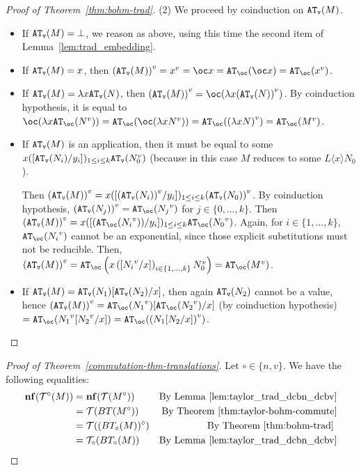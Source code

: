 \documentclass[10pt,a4paper]{article}
\newcommand{\<}{\langle}
\renewcommand{\>}{\rangle}
\newcommand{\nf}[1]{\mathbf{nf}(#1)}
\newcommand{\tradv}[1]{\ensuremath{{#1}^v}}
\newcommand{\taylor}[1]{\ensuremath{\mathcal{T}(#1)}}
\newcommand{\btb}{\ensuremath{{\tt{AT}_\oc}}}
\newcommand{\btv}{\ensuremath{{\tt{AT}_v}}}
\begin{document}
\begin{proof}[Proof of Theorem~\ref{thm:bohm-trad}]
	(2) We proceed by coinduction on $\btv(M)$.
	\begin{itemize}
		\item If $\btv(M)=\bot$, we reason as above, using this time the
			second item of Lemma~\ref{lem:trad_embedding}.
		\item If $\btv(M)=x$, then $\tradv{(\btv(M))}=\tradv x=\oc
			x=\btb(\oc x)=\btb(\tradv x)$.
		\item If $\btv(M)=\lambda x\btv(N)$, then
			$\tradv{(\btv(M))}=\oc(\lambda x\tradv{(\btv(N))})$. By
			coinduction hypothesis, it is equal to $\oc(\lambda
			x\btb(\tradv N))=\btb(\oc(\lambda x\tradv
			N))=\btb(\tradv{(\lambda xN)})=\btb(\tradv M)$.
		\item If $\btv(M)$ is an application, then it must be equal to
			some $x([\btv(N_i)/y_i])_{1\leq i\leq k}\btv(\tradv N_0)$
			(because in this case $M$ reduces to some $L\<x\>N_0$).
			
			Then $\tradv{(\btv(M))}=
			x([\tradv{(\btv(N_i))}/y_i])_{1\leq i\leq k}\tradv{(\btv(N_0))}$.
			By coinduction hypothesis,
			$\tradv{(\btv(N_j))}=\btb(\tradv{N_j})$ for
			$j\in\{0,\dots ,k\}$. Then
			$\tradv{(\btv(M))}=
			x([(\btb(\tradv{N_i}))/y_i])_{1\leq i\leq
			k}\btb(\tradv{N_0})$. Again, for $i\in\{1,\dots ,k\}$,
			$\btb(\tradv{N_i})$ cannot be an exponential, since
			those explicit substitutions must not be reducible. Then,
			$\tradv{(\btv(M))}=\btb\left(x\left([\tradv{N_i}/x]\right)_{i\in\{1,\dots ,k\}}\tradv
			N_0\right)=\btb(\tradv M)$.
		\item If $\btv(M)=\btv(N_1)[\btv(N_2)/x]$, then again $\btv(N_2)$
			cannot be a value, hence
			$\tradv{(\btv(M))}=\btb(\tradv{N_1})[\btb(\tradv{N_2})/x]$
			(by coinduction hypothesis)
			$=\btb(\tradv{N_1}[\tradv{N_2}/x])=\btb(\tradv{(N_1[N_2/x])})$. \qedhere
	\end{itemize}
\end{proof}

\begin{proof}[Proof of Theorem~\ref{commutation-thm-translations}]
	Let $\circ\in\{n,v\}$. We have the following equalities:
	\begin{align*}
		\nf{\mathcal T^\circ (M)} &= \nf{\taylor{M^\circ}} &\text{By
		Lemma~\ref{lem:taylor_trad_dcbn_dcbv}} \\
		&= \taylor{BT(M^\circ)}   &\text{By
		Theorem~\ref{thm:taylor-bohm-commute}}  \\
		&= \taylor{(BT_\circ(M)}^\circ) &\text{By
		Theorem~\ref{thm:bohm-trad} } \\
		&=\mathcal T_\circ(BT_\circ(M)) &\text{By
		Lemma~\ref{lem:taylor_trad_dcbn_dcbv}}
	\end{align*}
\end{proof}
\end{document}
